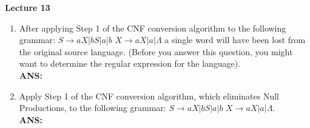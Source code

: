 \documentclass[letterpaper, 12 pt]{article}
\begin{document}
\Large \textbf{Lecture 13}

\normalsize

\begin{enumerate}
    \item[15.] [True or False] After applying Step 1 of the CNF conversion
        algorithm to the following grammar: $S\to aX|bS|a|b$ $X\to aX|a|\Lambda$
        a single word will have been lost from the original source language.
        (Before you answer this question, you might want to determine the
        regular expression for the language). \\
        \textbf{ANS:} 

    \item[16.] Apply Step 1 of the CNF conversion algorithm, which eliminates
        Null Productions, to the following grammar: $S\to aX|bS|a|b$ $X\to
        aX|a|\Lambda$. \\
        \textbf{ANS:} 


\end{enumerate}
\end{document}

